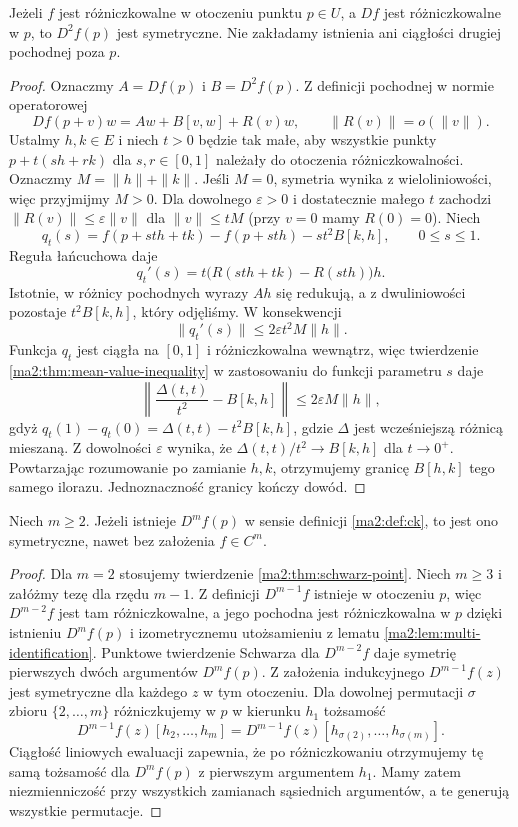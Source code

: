 \begin{twierdzenie}
\label{ma2:thm:schwarz-point}
Jeżeli $f$ jest różniczkowalne w otoczeniu punktu
$p\in U$, a $Df$ jest różniczkowalne w $p$, to
$D^2f(p)$ jest symetryczne. Nie zakładamy istnienia
ani ciągłości drugiej pochodnej poza $p$.
\end{twierdzenie}
\begin{proof}
Oznaczmy $A=Df(p)$ i $B=D^2f(p)$. Z definicji
pochodnej w normie operatorowej
\[
 Df(p+v)w=Aw+B[v,w]+R(v)w,\qquad
 \|R(v)\|=o(\|v\|).
\]
Ustalmy $h,k\in E$ i niech $t>0$ będzie tak małe,
aby wszystkie punkty $p+t(sh+rk)$ dla $s,r\in[0,1]$
należały do otoczenia różniczkowalności.
Oznaczmy $M=\|h\|+\|k\|$. Jeśli $M=0$, symetria
wynika z wieloliniowości, więc przyjmijmy $M>0$.
Dla dowolnego $\varepsilon>0$ i dostatecznie małego
$t$ zachodzi $\|R(v)\|\le\varepsilon\|v\|$ dla
$\|v\|\le tM$ (przy $v=0$ mamy $R(0)=0$).
Niech
\[
 q_t(s)=f(p+sth+tk)-f(p+sth)-st^2 B[k,h],
 \qquad 0\le s\le1.
\]
Reguła łańcuchowa daje
\[
 q_t'(s)=t\bigl(R(sth+tk)-R(sth)\bigr)h .
\]
Istotnie, w różnicy pochodnych wyrazy $Ah$
się redukują, a z dwuliniowości pozostaje
$t^2B[k,h]$, który odjęliśmy. W konsekwencji
\[
 \|q_t'(s)\|\le 2\varepsilon t^2M\|h\|.
\]
Funkcja $q_t$ jest ciągła na $[0,1]$ i
różniczkowalna wewnątrz, więc twierdzenie
\ref{ma2:thm:mean-value-inequality} w zastosowaniu
do funkcji parametru $s$ daje
\[
 \left\|\frac{\Delta(t,t)}{t^2}-B[k,h]\right\|
 \le 2\varepsilon M\|h\|,
\]
gdyż $q_t(1)-q_t(0)=\Delta(t,t)-t^2B[k,h]$,
gdzie $\Delta$ jest wcześniejszą różnicą mieszaną.
Z dowolności $\varepsilon$ wynika, że
$\Delta(t,t)/t^2\to B[k,h]$ dla $t\to0^+$.
Powtarzając rozumowanie po zamianie $h,k$,
otrzymujemy granicę $B[h,k]$ tego samego ilorazu.
Jednoznaczność granicy kończy dowód.
\end{proof}

\begin{wniosek}
\label{ma2:cor:pointwise-higher-symmetric}
Niech $m\ge2$. Jeżeli istnieje $D^mf(p)$ w sensie
definicji \ref{ma2:def:ck}, to jest ono symetryczne,
nawet bez założenia $f\in C^m$.
\end{wniosek}
\begin{proof}
Dla $m=2$ stosujemy twierdzenie
\ref{ma2:thm:schwarz-point}. Niech $m\ge3$ i załóżmy
tezę dla rzędu $m-1$. Z definicji $D^{m-1}f$
istnieje w otoczeniu $p$, więc $D^{m-2}f$ jest
tam różniczkowalne, a jego pochodna jest
różniczkowalna w $p$ dzięki istnieniu $D^mf(p)$
i izometrycznemu utożsamieniu z lematu
\ref{ma2:lem:multi-identification}. Punktowe twierdzenie
Schwarza dla $D^{m-2}f$ daje symetrię pierwszych
dwóch argumentów $D^mf(p)$.
Z założenia indukcyjnego $D^{m-1}f(z)$ jest
symetryczne dla każdego $z$ w tym otoczeniu.
Dla dowolnej permutacji $\sigma$ zbioru $\{2,\ldots,m\}$
różniczkujemy w $p$ w kierunku $h_1$ tożsamość
\[
 D^{m-1}f(z)[h_2,\ldots,h_m]
 =D^{m-1}f(z)[h_{\sigma(2)},\ldots,h_{\sigma(m)}].
\]
Ciągłość liniowych ewaluacji zapewnia, że po
różniczkowaniu otrzymujemy tę samą tożsamość
dla $D^mf(p)$ z pierwszym argumentem $h_1$.
Mamy zatem niezmienniczość przy wszystkich
zamianach sąsiednich argumentów, a te generują
wszystkie permutacje.
\end{proof}

